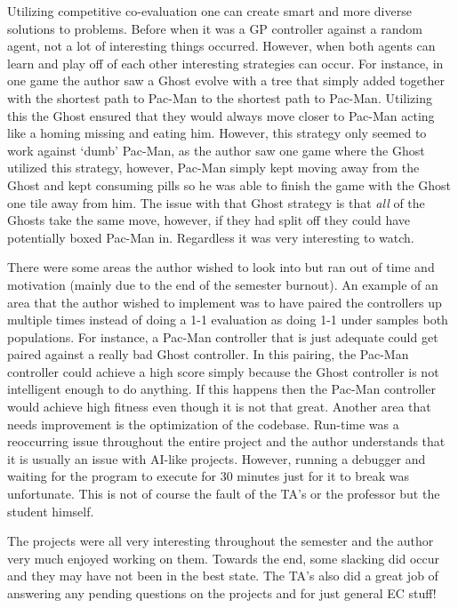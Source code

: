 Utilizing competitive co-evaluation one can create smart and more diverse solutions to problems.
Before when it was a GP controller against a random agent, not a lot of interesting things occurred.
However, when both agents can learn and play off of each other interesting strategies can occur.
For instance, in one game the author saw a Ghost evolve with a tree that simply added together with the shortest path to Pac-Man to the shortest path to Pac-Man.
Utilizing this the Ghost ensured that they would always move closer to Pac-Man acting like a homing missing and eating him.
However, this strategy only seemed to work against `dumb' Pac-Man, as the author saw one game where the Ghost utilized this strategy, however, Pac-Man simply kept moving away from the Ghost and kept consuming pills so he was able to finish the game with the Ghost one tile away from him.
The issue with that Ghost strategy is that \emph{all} of the Ghosts take the same move, however, if they had split off they could have potentially boxed Pac-Man in.
Regardless it was very interesting to watch.

There were some areas the author wished to look into but ran out of time and motivation (mainly due to the end of the semester burnout).
An example of an area that the author wished to implement was to have paired the controllers up multiple times instead of doing a 1-1 evaluation as doing 1-1 under samples both populations.
For instance, a Pac-Man controller that is just adequate could get paired against a really bad Ghost controller. 
In this pairing, the Pac-Man controller could achieve a high score simply because the Ghost controller is not intelligent enough to do anything.
If this happens then the Pac-Man controller would achieve high fitness even though it is not that great.
Another area that needs improvement is the optimization of the codebase.
Run-time was a reoccurring issue throughout the entire project and the author understands that it is usually an issue with AI-like projects.
However, running a debugger and waiting for the program to execute for 30 minutes just for it to break was unfortunate.
This is not of course the fault of the TA's or the professor but the student himself. 

The projects were all very interesting throughout the semester and the author very much enjoyed working on them.
Towards the end, some slacking did occur and they may have not been in the best state.
The TA's also did a great job of answering any pending questions on the projects and for just general EC stuff!
